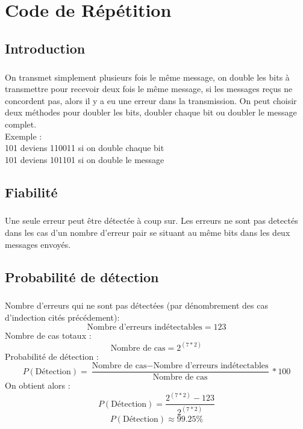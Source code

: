 
\chapter{Code de Répétition}

    \section{Introduction}

        \paragraph{}
On transmet simplement plusieurs fois le même message, on double les bits à transmettre pour recevoir deux fois le même message,
si les messages reçus ne concordent pas, alors il y a eu une erreur dans la transmission.
On peut choisir deux méthodes pour doubler les bits, doubler chaque bit ou doubler le message complet.
\\ Exemple :
\\ 101 deviens 110011 si on double chaque bit
\\ 101 deviens 101101 si on double le message


    \clearpage

    \section{Fiabilité}

        \paragraph{}
Une seule erreur peut être détectée à coup sur.
Les erreurs ne sont pas detectés dans les cas d'un nombre d'erreur pair se situant au même bits dans les deux messages envoyés.


    \section{Probabilité de détection}

        \paragraph{}
Nombre d'erreurs qui ne sont pas détectées (par dénombrement des cas d'indection cités précédement):
\[  \text{Nombre d'erreurs indétectables} = 123 \]
Nombre de cas totaux :
\[  \text{Nombre de cas} = 2^{(7*2)} \]
Probabilité de détection :
\[  P(\text{Détection}) = \frac{\text{Nombre de cas} - \text{Nombre d'erreurs indétectables}}{\text{Nombre de cas}}*100 \]
On obtient alors :
\[  P(\text{Détection}) = \frac{2^{(7*2)} - 123}{2^{(7*2)}} \]
\[  P(\text{Détection}) \approx 99.25\% \]



